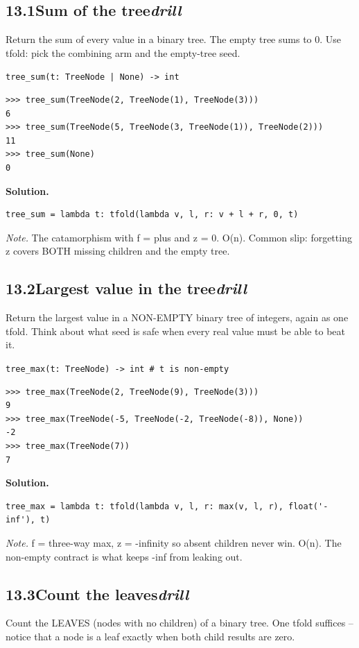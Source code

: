 \documentclass[10pt,letterpaper]{book}
\begin{document}
\subsection*{13.1\quad Sum of the tree\hfill\textnormal{\textit{drill}}}
Return the sum of every value in a binary tree. The empty tree sums to 0. Use tfold: pick the combining arm and the empty-tree seed.

\noindent\texttt{tree\_sum(t: TreeNode | None) -> int}
\begin{lstlisting}[style=ex]
>>> tree_sum(TreeNode(2, TreeNode(1), TreeNode(3)))
6
>>> tree_sum(TreeNode(5, TreeNode(3, TreeNode(1)), TreeNode(2)))
11
>>> tree_sum(None)
0
\end{lstlisting}
\noindent\textbf{Solution.}
\begin{lstlisting}[style=code]
tree_sum = lambda t: tfold(lambda v, l, r: v + l + r, 0, t)
\end{lstlisting}
\noindent\textit{Note.} The catamorphism with f = plus and z = 0. O(n). Common slip: forgetting z covers BOTH missing children and the empty tree.

\subsection*{13.2\quad Largest value in the tree\hfill\textnormal{\textit{drill}}}
Return the largest value in a NON-EMPTY binary tree of integers, again as one tfold. Think about what seed is safe when every real value must be able to beat it.

\noindent\texttt{tree\_max(t: TreeNode) -> int   \# t is non-empty}
\begin{lstlisting}[style=ex]
>>> tree_max(TreeNode(2, TreeNode(9), TreeNode(3)))
9
>>> tree_max(TreeNode(-5, TreeNode(-2, TreeNode(-8)), None))
-2
>>> tree_max(TreeNode(7))
7
\end{lstlisting}
\noindent\textbf{Solution.}
\begin{lstlisting}[style=code]
tree_max = lambda t: tfold(lambda v, l, r: max(v, l, r), float('-inf'), t)
\end{lstlisting}
\noindent\textit{Note.} f = three-way max, z = -infinity so absent children never win. O(n). The non-empty contract is what keeps -inf from leaking out.

\subsection*{13.3\quad Count the leaves\hfill\textnormal{\textit{drill}}}
Count the LEAVES (nodes with no children) of a binary tree. One tfold suffices -- notice that a node is a leaf exactly when both child results are zero.
\end{document}
